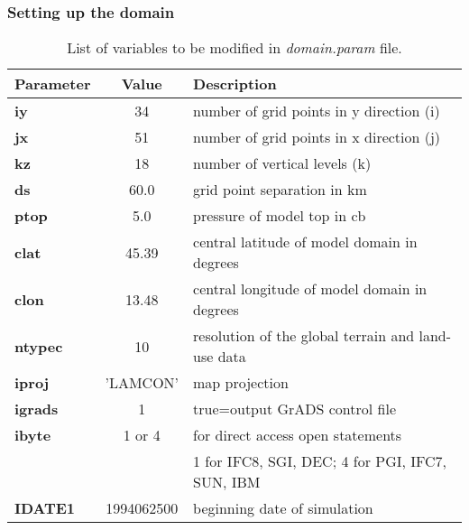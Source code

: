 \subsubsection{Setting up the domain}
\begin{table}[h]
\begin{center}
\caption{List of variables to be modified in {\it domain.param} file.}  \label{domain_file}
\vspace{0.25cm}
\begin{tabular}{|l|c|l|} \hline \hline
{\small {\bf Parameter}} &  {\small {\bf Value}} & {\small {\bf Description}} \\ \hline \hline
{\footnotesize {\bf iy}}   & {\footnotesize {34} }  & {\footnotesize number of grid points in y direction (i)} \\ \hline
{\footnotesize {\bf jx}}   & {\footnotesize {51} }   & {\footnotesize number of grid points in x direction (j)} \\ \hline
{\footnotesize {\bf kz}}   & {\footnotesize {18}}    & {\footnotesize number of vertical levels (k)} \\ \hline
{\footnotesize {\bf ds}}   & {\footnotesize {60.0}}    & {\footnotesize grid point separation in km} \\ \hline
{\footnotesize {\bf ptop}} & {\footnotesize {5.0}}    & {\footnotesize pressure of model top in cb} \\ \hline
{\footnotesize {\bf clat}} & {\footnotesize {45.39}}    & {\footnotesize central latitude of model domain in degrees} \\  \hline
{\footnotesize {\bf clon}} & {\footnotesize {13.48}}    & {\footnotesize central longitude of model domain in degrees} \\  \hline
{\footnotesize {\bf ntypec}} & {\footnotesize {10}}  & {\footnotesize resolution of the global terrain and land-use data } \\ \hline
{\footnotesize {\bf iproj}}    & {\footnotesize {'LAMCON'}} & {\footnotesize map projection} \\ \hline
{\footnotesize {\bf igrads}}   & {\footnotesize {1}} & {\footnotesize true=output GrADS control file} \\ \hline
{\footnotesize {\bf ibyte}} & {\footnotesize {1 or 4}}  & {\footnotesize for direct access open statements} \\  
 & & {\footnotesize  1 for IFC8, SGI, DEC;  4 for PGI, IFC7, SUN, IBM} \\ \hline
{\footnotesize {\bf IDATE1}}   & {\footnotesize {1994062500}} & {\footnotesize beginning date of simulation} \\ \hline

\end{tabular}
\end{center}
\end{table}
